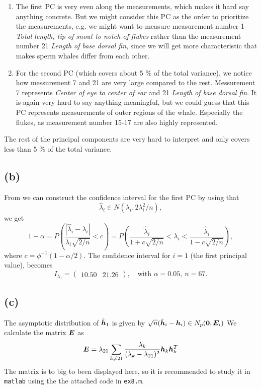 \begin{enumerate}
\item The first PC is very even along the measurements, which makes it
  hard say anything concrete. But we might consider this PC as the
  order to prioritize the measurements, e.g. we might want to measure
  measurement number 1 \textit{Total length, tip of snout to notch of
    flukes} rather than the measurement number 21 \textit{Length of base
    dorsal fin}, since we will get more characteristic that makes sperm
  whales differ from each other.
\item For the second PC (which  covers about 5 \% of the total variance), we notice how messurement 7 and 21 are very
  large compared to the rest. Messurement 7 represents \textit{Center of
    eye to center of ear} and 21 \textit{Length of base  dorsal fin}. It
  is again very hard to say anything meaningful, but we could guess that
  this PC represents measurements of outer regions of the
  whale. Especially the flukes, as measurement number 15-17 are also
  highly represented.
\end{enumerate}
The rest of the principal components are very hard to interpret and only
covers less than 5 \% of the total variance.

\subsection*{(b)}
\label{sec:b-7}
 From \cite[pp. 456-457]{book} we can construct the confidence interval for the first PC by using
 that
 \begin{equation*}
   \hat\lambda_i \in N(\lambda_i, 2\lambda^2_i/n),
 \end{equation*}
we get
\begin{equation*}
 1- \alpha =  P\left(\frac{|\hat\lambda_i - \lambda_i|}{\lambda_i\sqrt{2/n}} < c\right) =
 P\left(\frac{\hat\lambda_i}{1 + c\sqrt{2/n}} < \lambda_{i} < \frac{\hat\lambda_i}{1 - c\sqrt{2/n}}\right),
\end{equation*}
where $c = \phi^{-1}(1 - \alpha/2)$. The confidence interval for $i =
1$ (the first principal value), becomes
\begin{equation*}
  I_{\lambda_{1}} =
  \begin{pmatrix}
    10.50 &21.26 
  \end{pmatrix}
, \quad \text{with }\alpha = 0.05,\ n = 67.
\end{equation*}

\subsection*{(c)}
\label{sec:c-7}
The asymptotic distribution of $ \hat{\bm{h}}_1$ is given by $\sqrt n
(\hat{\bm{h}}_i - \bm{h}_i) \in N_p(\bm{0}, \bm{E}_i)$
We calculate the matrix $\bm{E}$ as
\begin{equation*}
  \bm{E} = \lambda_{21} \sum_{k \neq 21}\frac{\lambda_k}{(\lambda_k -
    \lambda_{21})^2 }\bm{h}_k \bm{h}_k^T
\end{equation*}
The matrix is to big to been displayed here, so it is recommended to
study it in \texttt{matlab} using the the attached code in
\texttt{ex8.m}.

